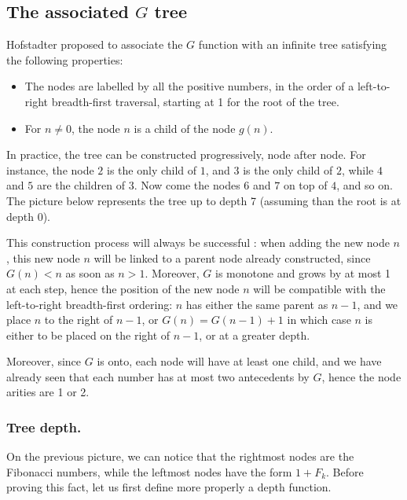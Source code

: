 \documentclass[a4paper,11pt]{article}
\begin{document}
\subsection{The associated $G$ tree}

Hofstadter proposed to associate the $G$ function with an infinite
tree satisfying the following properties:
\begin{itemize}
\item The nodes are labelled by all the positive numbers,
 in the order of a left-to-right breadth-first traversal,
 starting at 1 for the root of the tree.
\item For $n\neq 0$, the node $n$ is a child of the node $g(n)$.
\end{itemize}

In practice, the tree can be constructed progressively, node after node.
For instance, the node $2$ is the only child of $1$, and $3$
is the only child of $2$, while $4$ and $5$ are the children of $3$.
Now come the nodes $6$ and $7$ on top of $4$, and so on. The picture
below represents the tree up to depth 7 (assuming than the root is
at depth 0).

\bigskip


This construction process will always be successful : when adding the
new node $n$, this new node $n$ will be linked
to a parent node already constructed, since $G(n)<n$ as soon as $n>1$.
Moreover, $G$ is monotone and
grows by at most 1 at each step, hence the position of the new node
$n$ will be compatible with the left-to-right breadth-first ordering:
$n$ has either the same parent as $n-1$, and we place $n$ to the right
of $n-1$, or $G(n)=G(n-1)+1$ in which case $n$ is either to be placed
on the right of $n-1$, or at a greater depth.

Moreover, since $G$ is onto, each node will have at least one child,
and we have already seen that each number has at most two antecedents
by $G$, hence the node arities are 1 or 2.

\subsubsection*{Tree depth.}
On the previous picture, we can notice that the rightmost nodes are
the Fibonacci numbers, while the leftmost nodes have the form $1+F_k$.
Before proving this fact, let us first define more properly a depth
function.
\end{document}
